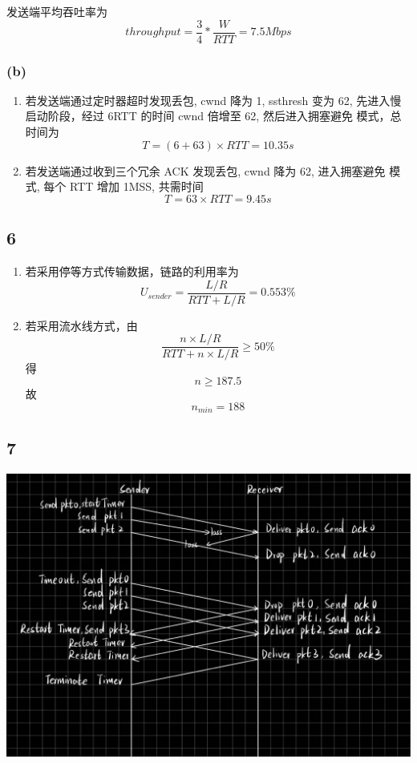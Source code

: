 \documentclass[UTF8]{ctexart}
\begin{document}
\begin{sloppypar}
        发送端平均吞吐率为$$throughput = \frac{3}{4} * \frac{W}{RTT}= 7.5 Mbps$$
    \subsubsection*{(b)}
        \begin{enumerate}
            \item 若发送端通过定时器超时发现丢包, cwnd 降为 1, ssthresh 变为 62,
                先进入慢启动阶段，经过 6RTT 的时间 cwnd 倍增至 62, 然后进入拥塞避免
                模式，总时间为 \[T = (6 + 63) \times RTT = 10.35s\]
            \item 若发送端通过收到三个冗余 ACK 发现丢包, cwnd 降为 62, 进入拥塞避免
                模式, 每个 RTT 增加 1MSS, 共需时间 \[T = 63 \times RTT = 9.45s\]

                
        \end{enumerate}

\subsection*{6}
    \begin{enumerate}
        \item 若采用停等方式传输数据，链路的利用率为$$U_{sender} =
            \frac{L/R}{RTT + L/R} = 0.553\%$$
        \item 若采用流水线方式，由$$\frac{n \times L/R}{RTT
        + n \times L/R} \geq 50\%$$得$$n \geq 187.5$$
        故$$n_{min} = 188$$
    \end{enumerate}

\subsection*{7}
    \includegraphics[width = .8\textwidth]{Q7_Answer.jpg}


\end{sloppypar}
\end{document}
